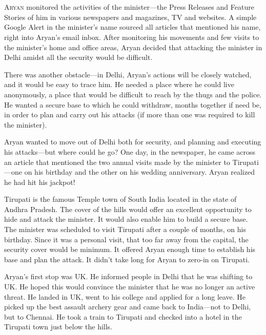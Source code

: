 \chapter{}

\lettrine{A}{ryan} monitored the activities of the minister—the Press Releases and Feature
Stories of him in various newspapers and magazines, TV and websites. A simple
Google Alert in the minister's name sourced all articles that mentioned his
name, right into Aryan's email inbox. After monitoring his movements and few
visits to the minister's home and office areas, Aryan decided that attacking the
minister in Delhi amidst all the security would be difficult.

There was another obstacle—in Delhi, Aryan's actions will be closely watched,
and it would be easy to trace him. He needed a place where he could live
anonymously, a place that would be difficult to reach by the thugs and the
police. He wanted a secure base to which he could withdraw, months together if
need be, in order to plan and carry out his attacks (if more than one was
required to kill the minister).

Aryan wanted to move out of Delhi both for security, and planning and executing
his attacks—but where could he go? One day, in the newspaper, he came across
an article that mentioned the two annual visits made by the minister to
Tirupati—one on his birthday and the other on his wedding anniversary. Aryan
realized
he had hit his jackpot!

Tirupati is the famous Temple town of South India located in the state of Andhra
Pradesh. The cover of the hills would offer an excellent opportunity to hide and
attack the minister. It would also enable him to build a secure base. The
minister was scheduled to visit Tirupati after a couple of months, on his
birthday. Since it was a personal visit, that too far away from the capital, the
security cover would be minimum. It offered Aryan enough time to establish his
base and plan the attack. It didn't take long for Aryan to zero-in on Tirupati.

Aryan's first stop was UK. He informed people in Delhi that he was shifting to
UK. He hoped this would convince the minister that he was no longer an active
threat. He landed in UK, went to his college and applied for a long leave. He
picked up the best assault archery gear and came back to India—not to Delhi,
but to Chennai. He took a train to Tirupati and checked into a hotel in the
Tirupati town just below the hills.